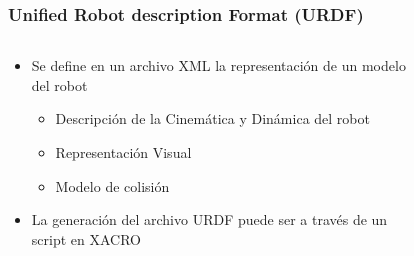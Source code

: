 \begin{frame}
	\frametitle{Unified Robot description Format (URDF)}
 	\begin{columns}
		\begin{column}{0.5\textwidth}
			\begin{itemize}
				\item Se define en un archivo XML la representación de un modelo del robot
				\begin{itemize}
					\item Descripción de la Cinemática y Dinámica del robot
					\item Representación Visual
					\item Modelo de colisión
				\end{itemize}
				\item La generación del archivo URDF puede ser a través de un script en XACRO
			\end{itemize}
		\end{column}
		\begin{column}{0.5\textwidth}
			\begin{figure}[!h]
			\centering
			\end{figure}
		\end{column}
	\end{columns}
	
\end{frame}

